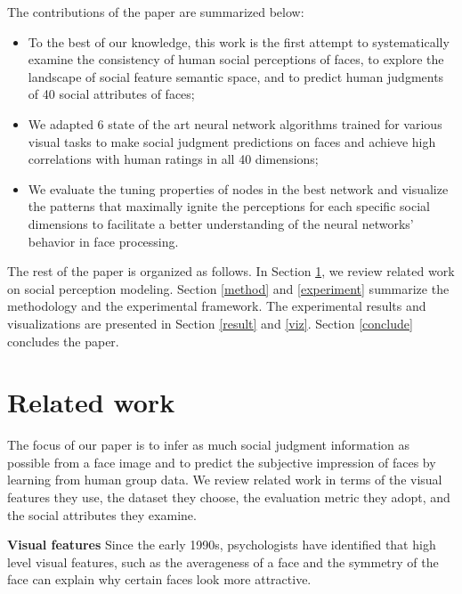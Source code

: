 \documentclass[10pt,twocolumn,letterpaper]{article}
\begin{document}
The contributions of the paper are summarized below:
\begin{itemize}
\item To the best of our knowledge, this work is the first attempt to systematically examine the consistency of human social perceptions of faces, to explore the landscape of social feature semantic space, and to predict human judgments of 40 social attributes of faces; 
\item We adapted 6 state of the art neural network algorithms trained for various visual tasks to make social judgment predictions on faces and achieve high correlations with human ratings in all 40 dimensions;
\item We evaluate the tuning properties of nodes in the best network and visualize the patterns that maximally ignite the perceptions for each specific social dimensions to facilitate a better understanding of the neural networks' behavior in face processing. 
\end{itemize}

The rest of the paper is organized as follows. In Section \ref{related_work}, we review related work on social perception modeling. Section \ref{method} and \ref{experiment} summarize the methodology and the experimental framework. The experimental results and visualizations are presented in Section \ref{result} and \ref{viz}. Section \ref{conclude} concludes the paper. 


\section{Related work} \label{related_work}
The focus of our paper is to infer as much social judgment information as possible from a face image and to predict the subjective impression of faces by learning from human group data. We review related work in terms of the visual features they use, the dataset they choose, the evaluation metric they adopt, and the social attributes they examine. 

\textbf{Visual features} 
Since the early 1990s, psychologists have identified that high level visual features, such as the averageness of a face\cite{langlois1990attractive, rhodes2003fitting} and the symmetry of the face \cite{scheib1999facial} can explain why certain faces look more attractive.
\end{document}
